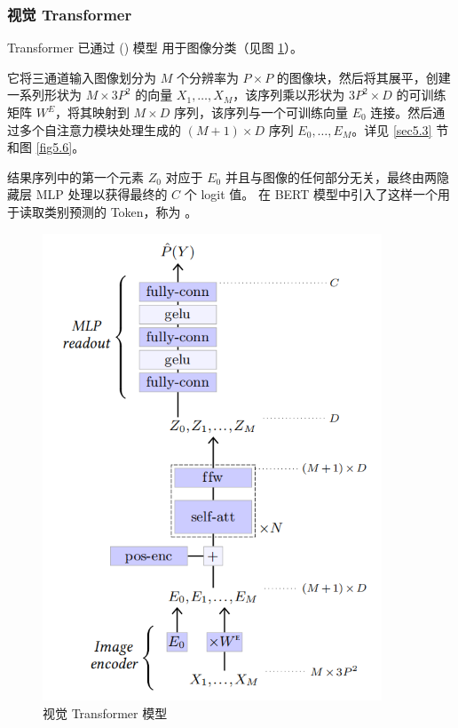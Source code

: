 \subsubsection*{视觉 Transformer}

Transformer 已通过 () 模型 \citep{arxiv-2010.11929} 用于图像分类（见图 \ref{fig5.9}）。

它将三通道输入图像划分为 $M$ 个分辨率为 $P \times P$ 的图像块，然后将其展平，创建一系列形状为 $M \times 3P^2$ 的向量 $X_1,\dots,X_M$，该序列乘以形状为 $3P^2 \times D$ 的可训练矩阵 $W^E$，将其映射到 $M \times D$ 序列，该序列与一个可训练向量 $E_0$ 连接。然后通过多个自注意力模块处理生成的 $(M + 1) \times D$ 序列 $E_0,\dots,E_M$。详见 \ref{sec5.3} 节和图 \ref{fig5.6}。

结果序列中的第一个元素 $Z_0$ 对应于 $E_0$ 并且与图像的任何部分无关，最终由两隐藏层 MLP 处理以获得最终的 $C$ 个 logit 值。\cite{arxiv-1810.04805} 在 BERT 模型中引入了这样一个用于读取类别预测的 Token，称为 。

\begin{figure}
    \centering
    \includegraphics[width=0.9\textwidth]{fig/fig5.9.png}
    \caption[ViT 模型]{视觉 Transformer 模型 \citep{arxiv-2010.11929}}
    \label{fig5.9}
\end{figure}